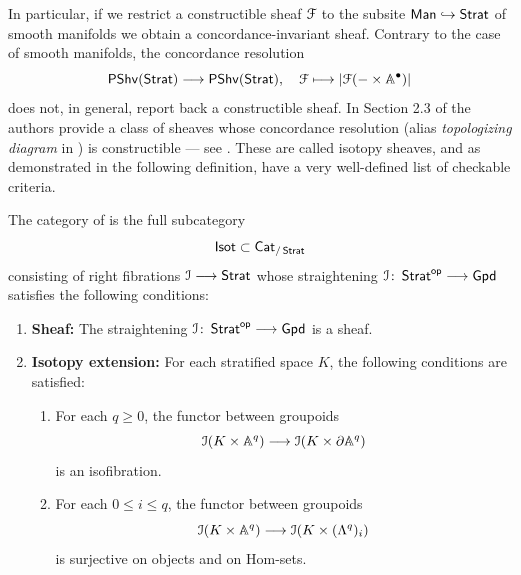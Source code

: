 In particular, if we restrict a constructible sheaf $\mathcal F$ to the subsite $\operatorname{\sf Man} \hookrightarrow \operatorname{\mathsf{Strat}}$ of smooth manifolds we obtain a concordance-invariant sheaf. Contrary to the case of smooth manifolds, the concordance resolution 
\begin{equation}
    \operatorname{\sf PShv}(\operatorname{\mathsf{Strat}}) \longrightarrow \operatorname{\sf PShv}(\operatorname{\mathsf{Strat}}), \quad \mathcal F \longmapsto \left| \mathcal F(-\times \mathbb A^{\bullet}) \right|
\end{equation}
does not, in general, report back a constructible sheaf. In Section 2.3 of \cite{AFR1} the authors provide a class of sheaves whose concordance resolution (alias \emph{topologizing diagram} in \cite{AFR1}) is constructible — see \cite[Theorem~2.3.14]{AFR1}. These are called isotopy sheaves, and as demonstrated in the following definition, have a very well-defined list of checkable criteria.
\begin{definition}\cite[Definition~2.3.8]{AFR1}
    The category of  is the full subcategory 
    \begin{equation}
        \mathsf{Isot} \subset \operatorname{{\sf Cat}}_{/\operatorname{\mathsf{Strat}}}
    \end{equation}
    consisting of right fibrations $\mathcal I \longrightarrow \operatorname{\mathsf{Strat}}$ whose straightening $\mathcal I \colon \operatorname{\mathsf{Strat}}^{\mathsf{op}} \longrightarrow \mathsf{Gpd}$ satisfies the following conditions:
    \begin{enumerate}
        \item \textbf{Sheaf:} The straightening $\mathcal I\colon \operatorname{\mathsf{Strat}}^{\mathsf{op}} \longrightarrow \mathsf{Gpd}$ is a sheaf. 
        \item \textbf{Isotopy extension:} For each stratified space $K$, the following conditions are satisfied:
        \begin{enumerate}
            \item For each $q\geq 0$, the functor between groupoids 
            \begin{equation}
                \mathcal I(K \times \mathbb A^q) \longrightarrow \mathcal I(K \times \partial \mathbb A^q)
            \end{equation}
            is an isofibration.
            \item For each $0\leq i \leq q$, the functor between groupoids
            \begin{equation}
                \mathcal I(K \times \mathbb A^q) \longrightarrow \mathcal I(K \times (\Lambda^q)_i)
            \end{equation}
            is surjective on objects and on Hom-sets.
        \end{enumerate}
    \end{enumerate}
\end{definition}


